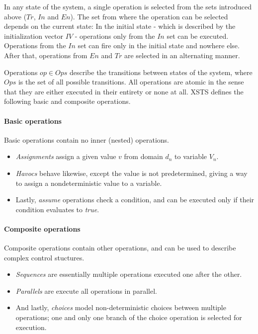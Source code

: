 In any state of the system, a single operation is selected from the sets introduced above (\(\mathit{Tr}\), \(\mathit{In}\) and \(\mathit{En}\)). The set from where the operation can be selected depends on the current state: In the initial state - which is described by the initialization vector \(\mathit{IV}\) - operations only from the \(\mathit{In}\) set can be executed. Operations from the \(\mathit{In}\) set can fire only in the initial state and nowhere else. After that, operations from \(\mathit{En}\) and \(\mathit{Tr}\) are selected in an alternating manner.

Operations \(\mathit{op} \in \mathit{Ops}\) describe the transitions between states of the system, where \(\mathit{Ops}\) is the set of all possible transitions. All operations are atomic in the sense that they are either executed in their entirety or none at all. XSTS defines the following basic and composite operations.

\paragraph{Basic operations} 

Basic operations contain no inner (nested) operations.

\begin{itemize}
	\item \emph{Assignments} assign a given value \(v\) from domain \(d_n\) to variable \(V_n\).
	\item \emph{Havocs} behave likewise, except the value is not predetermined, giving a way to assign a nondeterministic value to a variable.
	\item Lastly, \emph{assume} operations check a condition, and can be executed only if their condition evaluates to \emph{true}.
\end{itemize}

\paragraph{Composite operations}

Composite operations contain other operations, and can be used to describe complex control stuctures. 

\begin{itemize}
	\item \emph{Sequences} are essentially multiple operations executed one after the other.
	\item \emph{Parallels} are execute all operations in parallel.
	\item And lastly, \emph{choices} model non-deterministic choices between multiple operations; one and only one branch of the choice operation is selected for execution.
\end{itemize}

